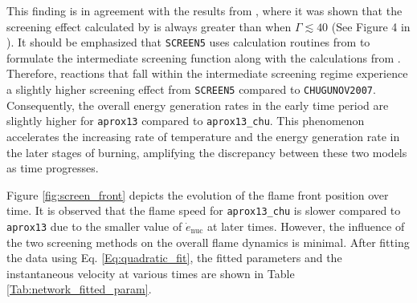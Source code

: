 \documentclass[preprint,times,tighten]{aastex631}
\begin{document}
This finding is in agreement with the results from \cite{Chugunov_2007}, where it was shown that the screening effect calculated by \cite{Alastuey_Jancovici:1978} is always greater than \cite{Chugunov_2007} when $\Gamma \lesssim 40$ (See Figure 4 in \cite{Chugunov_2007}). 
It should be emphasized that {\tt SCREEN5} uses calculation routines from \cite{Alastuey_Jancovici:1978} to formulate the intermediate screening function along with the calculations from \cite{Graboske_1973}. Therefore, reactions that fall within the intermediate screening regime experience a slightly higher screening effect from {\tt SCREEN5} compared to {\tt CHUGUNOV2007}. Consequently, the overall energy generation rates in the early time period are slightly higher for {\tt aprox13} compared to {\tt aprox13\_chu}. This phenomenon accelerates the increasing rate of temperature and the energy generation rate in the later stages of burning, amplifying the discrepancy between these two models as time progresses.





\begin{figure*}
\centering
{}
\caption{\label{fig:screen_front} Flame front position as a function of time for {\tt aprox13} and {\tt aprox13\_chu}. The dashed lines are the fitted curves using Eq. \ref{Eq:quadratic_fit}.}
\end{figure*}

Figure \ref{fig:screen_front} depicts the evolution of the flame front position over time. It is observed that the flame speed for {\tt aprox13\_chu} is slower compared to {\tt aprox13} due to the smaller value of $\dot{e}_{\textrm{nuc}}$ at later times. However, the influence of the two screening methods on the overall flame dynamics is minimal. After fitting the data using Eq. \ref{Eq:quadratic_fit}, the fitted parameters and the instantaneous velocity at various times are shown in Table \ref{Tab:network_fitted_param}. 
\end{document}
